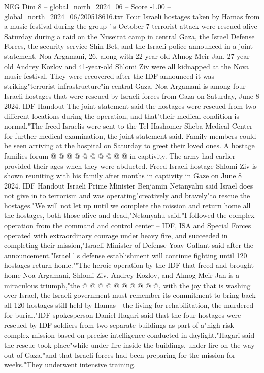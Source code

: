 \begin{textsample}{NEG Dim 8 – global\_north\_2024\_06 – Score -1.00 – global\_north\_2024\_06/200518616.txt}  \label{ex:f8_neg_395}
Four Israeli hostages taken by Hamas from a music festival during the group ' s October 7 terrorist attack were rescued alive Saturday during a raid on the Nuseirat camp in central Gaza, the Israel Defense Forces, the security service Shin Bet, and the Israeli police announced in a joint statement.
Noa Argamani, 26, along with 22-year-old Almog Meir Jan, 27-year-old Andrey Kozlov and 41-year-old Shlomi Ziv were all kidnapped at the Nova music festival.
They were recovered after the IDF announced it was striking"terrorist infrastructure"in central Gaza.
Noa Argamani is among four Israeli hostages that were rescued by Israeli forces from Gaza on Saturday, June 8 2024.
IDF Handout The joint statement said the hostages were rescued from two different locations during the operation, and that"their medical condition is normal."The freed Israelis were sent to the Tel Hashomer Sheba Medical Center for further medical examination, the joint statement said.
Family members could be seen arriving at the hospital on Saturday to greet their loved ones.
A hostage families forum @ @ @ @ @ @ @ @ @ @ in captivity.
The army had earlier provided their ages when they were abducted.
Freed Israeli hostage Shlomi Ziv is shown reuniting with his family after months in captivity in Gaze on June 8 2024.
IDF Handout Israeli Prime Minister Benjamin Netanyahu said Israel does not give in to terrorism and was operating"creatively and bravely"to rescue the hostages."We will not let up until we complete the mission and return home all the hostages, both those alive and dead,"Netanyahu said."I followed the complex operation from the command and control center -- IDF, ISA and Special Forces operated with extraordinary courage under heavy fire, and succeeded in completing their mission,"Israeli Minister of Defense Yoav Gallant said after the announcement."Israel ' s defense establishment will continue fighting until 120 hostages return home.""The heroic operation by the IDF that freed and brought home Noa Argamani, Shlomi Ziv, Andrey Kozlov, and Almog Meir Jan is a miraculous triumph,"the @ @ @ @ @ @ @ @ @ @, with the joy that is washing over Israel, the Israeli government must remember its commitment to bring back all 120 hostages still held by Hamas - the living for rehabilitation, the murdered for burial."IDF spokesperson Daniel Hagari said that the four hostages were rescued by IDF soldiers from two separate buildings as part of a"high risk complex mission based on precise intelligence conducted in daylight."Hagari said the rescue took place"while under fire inside the buildings, under fire on the way out of Gaza,"and that Israeli forces had been preparing for the mission for weeks."They underwent intensive training.

\end{textsample}
